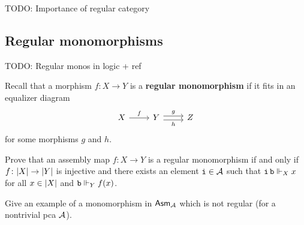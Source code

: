 \textcolor{Mulberry}{TODO: Importance of regular category}

\subsection{Regular monomorphisms}
\textcolor{Mulberry}{TODO: Regular monos in logic + ref}

Recall that a morphism \(f \colon X \to Y\) is a \textbf{regular monomorphism}
if it fits in an equalizer diagram
\[
  \begin{tikzcd}
    X \ar[r,"f"]
    & Y \ar[r,shift left, "g"]\ar[r, shift right, "h"']
    & Z
  \end{tikzcd}
\]
for some morphisms \(g\) and \(h\).

\begin{exercise}%
  \label{exer:characterize-regular-monos}
  Prove that an assembly map \(f \colon X \to Y\) is a regular monomorphism if
  and only if \(f \colon \carrier{X} \to \carrier{Y}\) is injective and there
  exists an element \(\pca{i} \in \AA\) such that
  \(\pca{i}\pca{b} \realizes_X x\) for all \(x \in \carrier{X}\) and
  \(\pca{b} \realizes_Y f(x)\).
\end{exercise}

\begin{exercise}\label{exer:mono-but-not-regular-mono}
  Give an example of a monomorphism in \(\Asm{\AA}\) which is not regular (for a
  nontrivial pca \(\AA\)).
\end{exercise}


